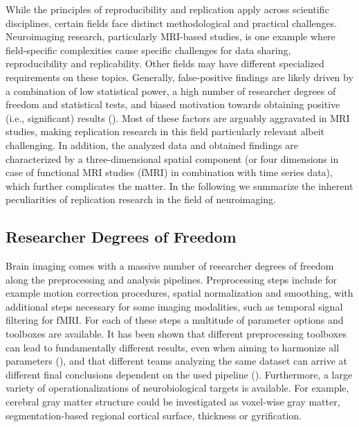 \documentclass[
  letterpaper,
  DIV=11,
  openany,
  fontsize=12pt,
  parskip=half,
  headings=big,
  numbers=noenddot,
  titlepage=false]{scrreprt}
\begin{document}
While the principles of reproducibility and replication apply across
scientific disciplines, certain fields face distinct methodological and
practical challenges. Neuroimaging research, particularly MRI-based
studies, is one example where field-specific complexities cause specific
challenges for data sharing, reproducibility and replicability. Other
fields may have different specialized requirements on these topics.
Generally, false-positive findings are likely driven by a combination of
low statistical power, a high number of researcher degrees of freedom
and statistical tests, and biased motivation towards obtaining positive
(i.e., significant) results (). Most of these factors are arguably aggravated in MRI studies,
making replication research in this field particularly relevant albeit
challenging. In addition, the analyzed data and obtained findings are
characterized by a three-dimensional spatial component (or four
dimensions in case of functional MRI studies (fMRI) in combination with
time series data), which further complicates the matter. In the
following we summarize the inherent peculiarities of replication
research in the field of neuroimaging.

\subsection{Researcher Degrees of
Freedom}\label{researcher-degrees-of-freedom}

Brain imaging comes with a massive number of researcher degrees of
freedom along the preprocessing and analysis pipelines. Preprocessing
steps include for example motion correction procedures, spatial
normalization and smoothing, with additional steps necessary for some
imaging modalities, such as temporal signal filtering for fMRI. For each
of these steps a multitude of parameter options and toolboxes are
available. It has been shown that different preprocessing toolboxes can
lead to fundamentally different results, even when aiming to harmonize
all parameters (), and
that different teams analyzing the same dataset can arrive at different
final conclusions dependent on the used pipeline
().
Furthermore, a large variety of operationalizations of neurobiological
targets is available. For example, cerebral gray matter structure could
be investigated as voxel-wise gray matter, segmentation-based regional
cortical surface, thickness or gyrification.
\end{document}
